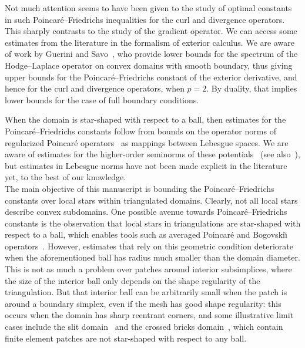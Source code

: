 \documentclass[10pt,a4paper]{article}
\begin{document}
Not much attention seems to have been given to the study of optimal constants in such Poincar\'e--Friedrichs inequalities for the curl and divergence operators. 
This sharply contrasts to the study of the gradient operator. 
We can access some estimates from the literature in the formalism of exterior calculus. 
We are aware of work by Guerini and Savo~\cite{guerini2004eigenvalue},
who provide lower bounds for the spectrum of the Hodge--Laplace operator on convex domains with smooth boundary, %
thus giving upper bounds for the Poincar\'e--Friedrichs constant of the exterior derivative, and hence for the curl and divergence operators, when $p=2$.
By duality, that implies lower bounds for the case of full boundary conditions.

When the domain is star-shaped with respect to a ball, then estimates for the Poincar\'e--Friedrichs constants 
follow from bounds on the operator norms of regularized Poincar\'e operators~\cite{costabel2010bogovskiui}
as mappings between Lebesgue spaces. 
We are aware of estimates for the higher-order seminorms of these potentials~\cite{guzman2021estimation} (see also~\cite{gallistl2023computational}),
but estimates in Lebesgue norms have not been made explicit in the literature yet, to the best of our knowledge.
\\


The main objective of this manuscript is bounding the Poincar\'e--Friedrichs constants over local stars within triangulated domains. 
Clearly, not all local stars describe convex subdomains. 
One possible avenue towards Poincar\'e--Friedrichs constants is the observation that local stars in triangulations are star-shaped with respect to a ball,
which enables tools such as averaged Poincar\'e and Bogovski\u{\i} operators~\cite{costabel2010bogovskiui}. 
However, estimates that rely on this geometric condition deteriorate when the aforementioned ball has radius much smaller than the domain diameter. 
This is not as much a problem over patches around interior subsimplices, where the size of the interior ball only depends on the shape regularity of the triangulation. 
But that interior ball can be arbitrarily small when the patch is around a boundary simplex, even if the mesh has good shape regularity: 
this occurs when the domain has sharp reentrant corners, and some illustrative limit cases include the slit domain~\cite{veeser2012poincare} and the crossed bricks domain~\cite{licht2019smoothed}, %
which contain finite element patches are not star-shaped with respect to any ball. 
\end{document}
